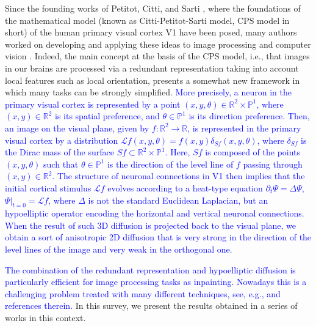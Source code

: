 \documentclass[proc]{edpsmath}
\begin{document}
Since the founding works of Petitot, Citti, and Sarti \cite{petitot,citti-sarti}, where the foundations of the mathematical model (known as Citti-Petitot-Sarti model, CPS model in short) of the human primary visual cortex V1 have been posed, many authors worked on developing and applying these ideas to image processing and computer vision \cite{Duits2010,Duits2010a,Sanguinetti,Bredies13,Hladky}. Indeed, the main concept at the basis of the CPS model, i.e., that images in our brains are processed via a redundant representation taking into account local features such as local orientation, presents a somewhat new framework in which many tasks can be strongly simplified.
\textcolor{blue}{
  More precisely, a neuron in the primary visual cortex is represented by a point  $(x,y,\theta)\in\mathbb R^2\times \mathbb P^1$, where $(x,y)\in\mathbb R^2$ is its spatial preference, and $\theta\in\mathbb P^1$ is its direction preference.
  Then, an image on the visual plane, given by $f:\mathbb R^2\to \mathbb R$, is represented in the primary visual cortex by a distribution $\mathcal L f(x,y,\theta)=f(x,y)\delta_{Sf}(x,y,\theta)$, where $\delta_{Sf}$ is the Dirac mass of the surface $Sf\subset \mathbb R^2\times \mathbb P^1$. Here, $Sf$ is composed of the points $(x,y,\theta)$ such that $\theta\in\mathbb P^1$ is the direction of the level line of $f$ passing through $(x,y)\in\mathbb R^2$.
  The structure of neuronal connections in V1 then implies that the initial cortical stimulus $\mathcal Lf$ evolves 
  according to a heat-type equation $\partial_t \Psi=\Delta \Psi$, $\Psi|_{t=0}=\mathcal Lf$, where $\Delta$ is not the standard Euclidean Laplacian, but an hypoelliptic operator encoding the horizontal and vertical neuronal connections.
  When the result of such 3D diffusion is projected back to the visual plane, we obtain a sort of anisotropic 2D diffusion that is very strong in the direction of the level lines of the image and very weak in the orthogonal one.}
  
  \textcolor{blue}{
  The combination of the redundant representation and hypoelliptic diffusion is particularly efficient for image processing tasks as inpainting. Nowadays this is a challenging problem treated with many different techniques, see, e.g., \cite{Bertalmio2000,Bertalmio2001,Masnou2002,Chan2002,Criminisi2004a} and references therein.}
In this survey, we present the results obtained in a series of works \cite{Boscain2012a, Remizov2013, Boscain2014, ahe, gros-papier} in this context. 
\end{document}
